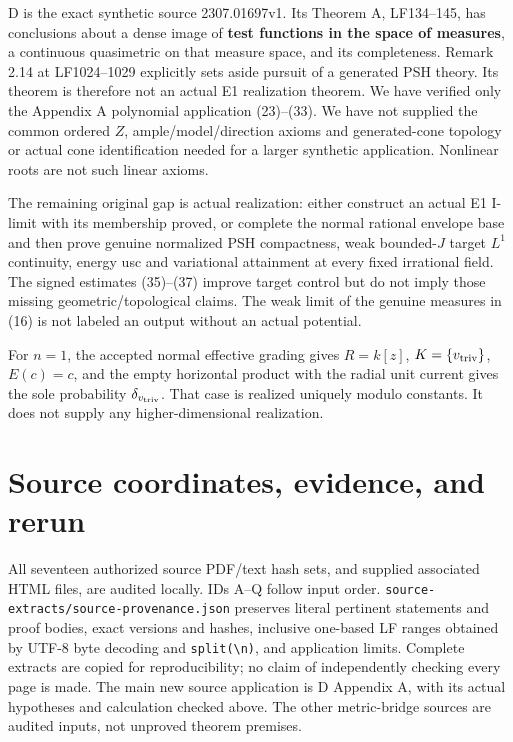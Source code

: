 \documentclass[
  10pt,
]{article}
\begin{document}
D is the exact synthetic source 2307.01697v1. Its Theorem A, LF134--145,
has conclusions about a dense image of \textbf{test functions in the
space of measures}, a continuous quasimetric on that measure space, and
its completeness. Remark 2.14 at LF1024--1029 explicitly sets aside
pursuit of a generated PSH theory. Its theorem is therefore not an
actual E1 realization theorem. We have verified only the Appendix A
polynomial application (23)--(33). We have not supplied the common
ordered \(Z\), ample/model/direction axioms and generated-cone topology
or actual cone identification needed for a larger synthetic application.
Nonlinear roots are not such linear axioms.

The remaining original gap is actual realization: either construct an
actual E1 I-limit with its membership proved, or complete the normal
rational envelope base and then prove genuine normalized PSH
compactness, weak bounded-\(J\) target \(L^1\) continuity, energy usc
and variational attainment at every fixed irrational field. The signed
estimates (35)--(37) improve target control but do not imply those
missing geometric/topological claims. The weak limit of the genuine
measures in (16) is not labeled an output without an actual potential.

For \(n=1\), the accepted normal effective grading gives \(R=k[z]\),
\(K=\{v_{\rm triv}\}\), \(E(c)=c\), and the empty horizontal product
with the radial unit current gives the sole probability
\(\delta_{v_{\rm triv}}\). That case is realized uniquely modulo
constants. It does not supply any higher-dimensional realization.

\section{Source coordinates, evidence, and
rerun}\label{source-coordinates-evidence-and-rerun}

All seventeen authorized source PDF/text hash sets, and supplied
associated HTML files, are audited locally. IDs A--Q follow input order.
\texttt{source-extracts/source-provenance.json} preserves literal
pertinent statements and proof bodies, exact versions and hashes,
inclusive one-based LF ranges obtained by UTF-8 byte decoding and
\texttt{split(\textquotesingle{}\textbackslash{}n\textquotesingle{})},
and application limits. Complete extracts are copied for
reproducibility; no claim of independently checking every page is made.
The main new source application is D Appendix A, with its actual
hypotheses and calculation checked above. The other metric-bridge
sources are audited inputs, not unproved theorem premises.
\end{document}
